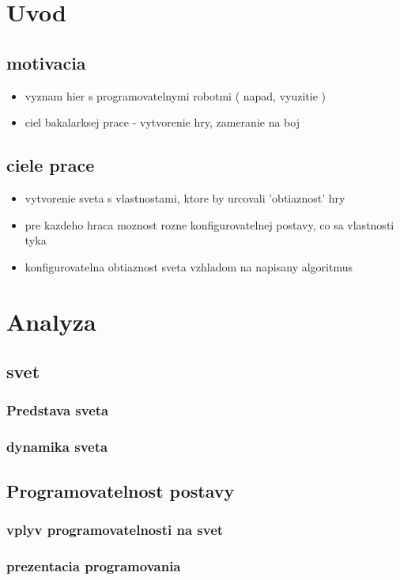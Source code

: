 \documentclass[12pt,notitlepage]{report}
\begin{document}
\chapter{Uvod}
\section{motivacia}
\begin{itemize}
\item vyznam hier s programovatelnymi robotmi ( napad, vyuzitie )
\item ciel bakalarksej prace - vytvorenie hry, zameranie na boj
\end{itemize}
\section{ciele prace}
\begin{itemize}
\item vytvorenie sveta s vlastnostami, ktore by urcovali 'obtiaznost' hry
\item pre kazdeho hraca moznost rozne konfigurovatelnej postavy, co sa vlastnosti tyka
\item konfigurovatelna obtiaznost sveta vzhladom na napisany algoritmus
\end{itemize}
\chapter{Analyza}
\section{svet}
\subsection{Predstava sveta}
\subsection{dynamika sveta}
\section{Programovatelnost postavy}
\subsection{vplyv programovatelnosti na svet}
\subsection{prezentacia programovania}
\end{document}
